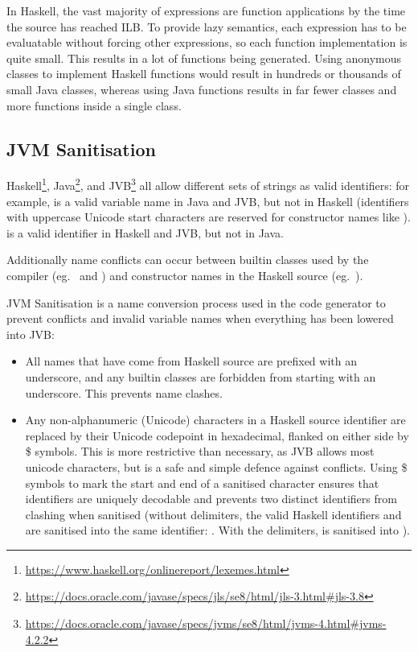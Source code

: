 \documentclass[dissertation.tex]{subfiles}
\begin{document}
{{{            In Haskell, the vast majority of expressions are function applications by the time the source has reached ILB. To provide lazy semantics, each expression has to be evaluatable without forcing other expressions, so each function implementation is quite small. This results in a lot of functions being generated. Using anonymous classes to implement Haskell functions would result in hundreds or thousands of small Java classes, whereas using Java functions results in far fewer classes and more functions inside a single class.
        }
    }
    \subsection{JVM Sanitisation}\label{sec:jvm-sanitisation}
    {
        Haskell\footnote{\url{https://www.haskell.org/onlinereport/lexemes.html}}, Java\footnote{\url{https://docs.oracle.com/javase/specs/jls/se8/html/jls-3.html\#jls-3.8}}, and JVB\footnote{\url{https://docs.oracle.com/javase/specs/jvms/se8/html/jvms-4.html\#jvms-4.2.2}} all allow different sets of strings as valid identifiers: for example,  is a valid variable name in Java and JVB, but not in Haskell (identifiers with uppercase Unicode start characters are reserved for constructor names like ). \monospace{(+)} is a valid identifier in Haskell and JVB, but not in Java.

        Additionally name conflicts can occur between builtin classes used by the compiler (eg.\  and ) and constructor names in the Haskell source (eg.\ ).

        JVM Sanitisation is a name conversion process used in the code generator to prevent conflicts and invalid variable names when everything has been lowered into JVB:

        \begin{itemize}
        \item
        {
            All names that have come from Haskell source are prefixed with an underscore, and any builtin classes are forbidden from starting with an underscore. This prevents name clashes.
        }
        \item
        {
            Any non-alphanumeric (Unicode) characters in a Haskell source identifier are replaced by their Unicode codepoint in hexadecimal, flanked on either side by \$ symbols. This is more restrictive than necessary, as JVB allows most unicode characters, but is a safe and simple defence against conflicts. Using \$ symbols to mark the start and end of a sanitised character ensures that identifiers are uniquely decodable and prevents two distinct identifiers from clashing when sanitised (without delimiters, the valid Haskell identifiers \haskell{#\(\pi\)#} and  are sanitised into the same identifier: . With the delimiters, \haskell{#\(\pi\)#} is sanitised into ).
        }
        \end{itemize}
    }
}
\end{document}
